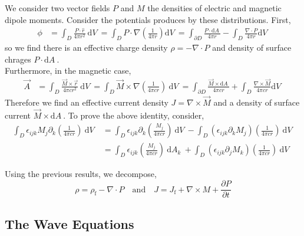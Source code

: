 \documentclass[12pt]{extarticle}
\renewcommand{\d}[1]{ \mathrm{d}#1 \:}
\newcommand{\pderiv}[2]{\frac{\partial{#1}}{\partial{#2}}}
\theoremstyle{definition}
\begin{document}
We consider two vector fields $P$ and $M$ the densities of electric and magnetic dipole moments. Consider the potentials produces by these distributions. First,
\begin{align*}
\phi & = \int_D \frac{P \cdot \hat{r}}{4 \pi r^2} \: \d{V} = \int_D P \cdot \nabla \left( \frac{1}{4 \pi r} \right) \d{V} = \int_{\partial D} \frac{P \cdot \d{A}}{4 \pi r} - \int_D \frac{\nabla \cdot P}{4 \pi r} \d{V}
\end{align*}
so we find there is an effective charge density $\rho = - \nabla \cdot P$ and density of surface chrages $P \cdot \d{A}$. 
\bigskip\\
Furthermore, in the magnetic case,
\begin{align*}
\vec{A} & = \int_D \frac{\vec{M} \times \vec{r}}{4 \pi c r^2} \: \d{V} = \int_D \vec{M} \times \nabla \left( \frac{1}{4 \pi c r} \right) \: \d{V} = \int_{\partial D} \frac{\vec{M} \times \d{A}}{4 \pi c r} + \int_D \frac{\nabla \times \vec{M}}{4 \pi c r} \d{V} 
\end{align*}
Therefore we find an effective current density $J = \nabla \times \vec{M}$ and a density of surface current $\vec{M} \times \d{A}$. To prove the above identity, consider,
\begin{align*}
\int_D \epsilon_{ijk} M_j \partial_k \left( \frac{1}{4 \pi c r} \right) \: \d{V} & = \int_D \epsilon_{ijk} \partial_k \left( \frac{M_j}{4 \pi c r} \right) \: \d{V} - \int_D \left( \epsilon_{ijk} \partial_k M_j \right) \left( \frac{1}{4 \pi c r} \right) \: \d{V}
\\
&  = \int_D \epsilon_{ijk} \left( \frac{M_j}{4 \pi c r} \right) \: \d{A_k} + \int_D (\epsilon_{ijk} \partial_j M_k) \left( \frac{1}{4 \pi c r} \right) \: \d{V}
\end{align*} 

\newcommand{\free}{\text{f}}

Using the previous results, we decompose,
\[ \rho = \rho_{\text{f}} - \nabla \cdot P \quad \text{and} \quad J = J_{\text{f}} + \nabla \times M + \pderiv{P}{t} \]

\subsection{The Wave Equations}
\end{document}
